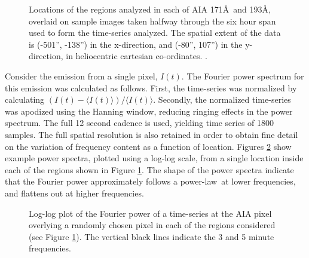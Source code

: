 \documentclass{aastex}
\newcommand{\PS}{power spectrum}
\newcommand{\PL}{power-law}
\begin{document}
\begin{figure}
\centerline{
}
\caption{Locations of the regions analyzed in each of AIA 171\AA\ and
  193\AA, overlaid on sample images taken halfway through the six hour
  span used to form the time-series analyzed.  The spatial extent of
  the data is (-501'', -138'') in the x-direction, and (-80'', 107'')
  in the y-direction, in heliocentric cartesian co-ordinates.
  \citep{2006A&A...449..791T}.}
\label{fig:loc171193}
\end{figure}

Consider the emission from a single pixel, $I(t)$.  The Fourier power
spectrum for this emission was calculated as follows.  First, the
time-series was normalized by calculating $(I(t) - \langle I(t)
\rangle)/\langle I(t) \rangle$. Secondly, the normalized time-series
was apodized using the Hanning window, reducing ringing effects in the
\PS.  The full 12 second cadence is used, yielding time series of 1800
samples.  The full spatial resolution is also retained in order to
obtain fine detail on the variation of frequency content as a function
of location.  Figures \ref{fig:compare171193} show example power
spectra, plotted using a log-log scale, from a single location inside
each of the regions shown in Figure \ref{fig:loc171193}.  The shape of
the power spectra indicate that the Fourier power approximately
follows a \PL\ at lower frequencies, and flattens out at higher
frequencies.

\begin{figure}
\centerline{
}
\centerline{
}
\caption{Log-log plot of the Fourier power of a time-series at the AIA
  pixel overlying a randomly chosen pixel in each of the regions
  considered (see Figure \protect\ref{fig:loc171193}).  The vertical
  black lines indicate the 3 and 5 minute frequencies.}
\label{fig:compare171193}
\end{figure}
\end{document}
